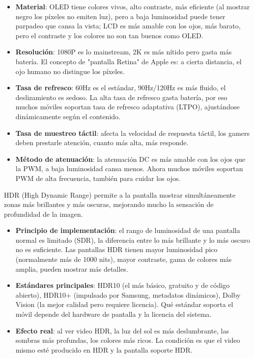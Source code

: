 \begin{itemize}
  \item \textbf{Material}: OLED tiene colores vivos, alto contraste, más eficiente (al mostrar negro los píxeles no emiten luz), pero a baja luminosidad puede tener parpadeo que cansa la vista; LCD es más amable con los ojos, más barato, pero el contraste y los colores no son tan buenos como OLED.
  \item \textbf{Resolución}: 1080P es lo mainstream, 2K es más nítido pero gasta más batería. El concepto de "pantalla Retina" de Apple es: a cierta distancia, el ojo humano no distingue los píxeles.
  \item \textbf{Tasa de refresco}: 60Hz es el estándar, 90Hz/120Hz es más fluido, el deslizamiento es sedoso. La alta tasa de refresco gasta batería, por eso muchos móviles soportan tasa de refresco adaptativa (LTPO), ajustándose dinámicamente según el contenido.
  \item \textbf{Tasa de muestreo táctil}: afecta la velocidad de respuesta táctil, los gamers deben prestarle atención, cuanto más alta, más responde.
  \item \textbf{Método de atenuación}: la atenuación DC es más amable con los ojos que la PWM, a baja luminosidad cansa menos. Ahora muchos móviles soportan PWM de alta frecuencia, también para cuidar los ojos.
\end{itemize}


HDR (High Dynamic Range) permite a la pantalla mostrar simultáneamente zonas más brillantes y más oscuras, mejorando mucho la sensación de profundidad de la imagen.

\begin{itemize}
  \item \textbf{Principio de implementación}: el rango de luminosidad de una pantalla normal es limitado (SDR), la diferencia entre lo más brillante y lo más oscuro no es suficiente. Las pantallas HDR tienen mayor luminosidad pico (normalmente más de 1000 nits), mayor contraste, gama de colores más amplia, pueden mostrar más detalles.
  \item \textbf{Estándares principales}: HDR10 (el más básico, gratuito y de código abierto), HDR10+ (impulsado por Samsung, metadatos dinámicos), Dolby Vision (la mejor calidad pero requiere licencia). Qué estándar soporta el móvil depende del hardware de pantalla y la licencia del sistema.
  \item \textbf{Efecto real}: al ver video HDR, la luz del sol es más deslumbrante, las sombras más profundas, los colores más ricos. La condición es que el video mismo esté producido en HDR y la pantalla soporte HDR.
\end{itemize}

